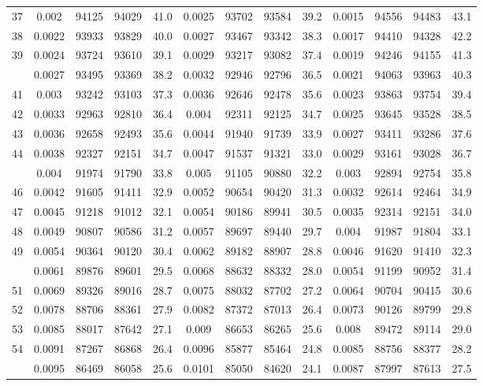 \documentclass[
  14pt,
]{article}
\begin{document}
\begin{longtable}[t]{lcccccccccccc}
37 & 0.002 & 94125 & 94029 & 41.0 & 0.0025 & 93702 & 93584 & 39.2 & 0.0015 & 94556 & 94483 & 43.1\\
38 & 0.0022 & 93933 & 93829 & 40.0 & 0.0027 & 93467 & 93342 & 38.3 & 0.0017 & 94410 & 94328 & 42.2\\
39 & 0.0024 & 93724 & 93610 & 39.1 & 0.0029 & 93217 & 93082 & 37.4 & 0.0019 & 94246 & 94155 & 41.3\\
\addlinespace
40 & 0.0027 & 93495 & 93369 & 38.2 & 0.0032 & 92946 & 92796 & 36.5 & 0.0021 & 94063 & 93963 & 40.3\\
41 & 0.003 & 93242 & 93103 & 37.3 & 0.0036 & 92646 & 92478 & 35.6 & 0.0023 & 93863 & 93754 & 39.4\\
42 & 0.0033 & 92963 & 92810 & 36.4 & 0.004 & 92311 & 92125 & 34.7 & 0.0025 & 93645 & 93528 & 38.5\\
43 & 0.0036 & 92658 & 92493 & 35.6 & 0.0044 & 91940 & 91739 & 33.9 & 0.0027 & 93411 & 93286 & 37.6\\
44 & 0.0038 & 92327 & 92151 & 34.7 & 0.0047 & 91537 & 91321 & 33.0 & 0.0029 & 93161 & 93028 & 36.7\\
\addlinespace
45 & 0.004 & 91974 & 91790 & 33.8 & 0.005 & 91105 & 90880 & 32.2 & 0.003 & 92894 & 92754 & 35.8\\
46 & 0.0042 & 91605 & 91411 & 32.9 & 0.0052 & 90654 & 90420 & 31.3 & 0.0032 & 92614 & 92464 & 34.9\\
47 & 0.0045 & 91218 & 91012 & 32.1 & 0.0054 & 90186 & 89941 & 30.5 & 0.0035 & 92314 & 92151 & 34.0\\
48 & 0.0049 & 90807 & 90586 & 31.2 & 0.0057 & 89697 & 89440 & 29.7 & 0.004 & 91987 & 91804 & 33.1\\
49 & 0.0054 & 90364 & 90120 & 30.4 & 0.0062 & 89182 & 88907 & 28.8 & 0.0046 & 91620 & 91410 & 32.3\\
\addlinespace
50 & 0.0061 & 89876 & 89601 & 29.5 & 0.0068 & 88632 & 88332 & 28.0 & 0.0054 & 91199 & 90952 & 31.4\\
51 & 0.0069 & 89326 & 89016 & 28.7 & 0.0075 & 88032 & 87702 & 27.2 & 0.0064 & 90704 & 90415 & 30.6\\
52 & 0.0078 & 88706 & 88361 & 27.9 & 0.0082 & 87372 & 87013 & 26.4 & 0.0073 & 90126 & 89799 & 29.8\\
53 & 0.0085 & 88017 & 87642 & 27.1 & 0.009 & 86653 & 86265 & 25.6 & 0.008 & 89472 & 89114 & 29.0\\
54 & 0.0091 & 87267 & 86868 & 26.4 & 0.0096 & 85877 & 85464 & 24.8 & 0.0085 & 88756 & 88377 & 28.2\\
\addlinespace
55 & 0.0095 & 86469 & 86058 & 25.6 & 0.0101 & 85050 & 84620 & 24.1 & 0.0087 & 87997 & 87613 & 27.5\\

\end{longtable}
\end{document}
